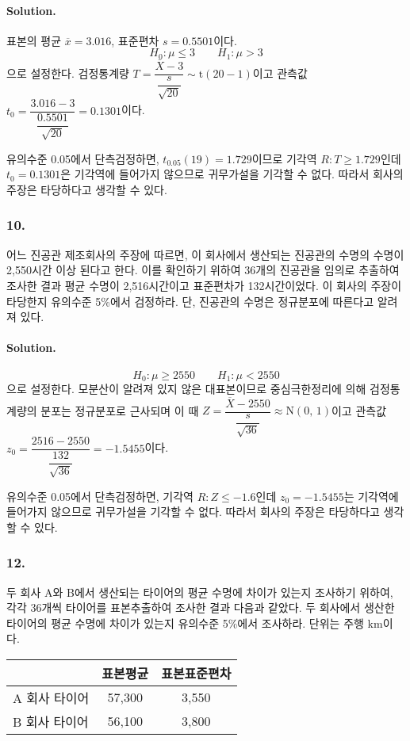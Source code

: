 \paragraph{Solution.} 표본의 평균 $\overline{x}=3.016$, 표준편차 $s=0.5501$이다.
\[H_0:\mu\leq3 \qquad H_1:\mu>3\]
으로 설정한다. 검정통계량 $T=\dfrac{\overline{X}-3}{\dfrac{s}{\sqrt{20}}}\sim \mathrm{t}\left(20-1\right)$이고
관측값 $t_0=\dfrac{3.016-3}{\dfrac{0.5501}{\sqrt{20}}}=0.1301$이다.

유의수준 0.05에서 단측검정하면, $t_{0.05}\left(19\right)=1.729$이므로 기각역 $R:T\geq 1.729$인데
$t_0=0.1301$은 기각역에 들어가지 않으므로 귀무가설을 기각할 수 없다. 따라서 회사의 주장은 타당하다고 생각할 수 있다.

\subsubsection{10.} 어느 진공관 제조회사의 주장에 따르면, 이 회사에서 생산되는 진공관의 수명의 수명이 2,550시간 이상 된다고 한다.
이를 확인하기 위하여 36개의 진공관을 임의로 추출하여 조사한 결과 평균 수명이 2,516시간이고 표준편차가 132시간이었다. 이 회사의 주장이 타당한지
유의수준 5\%에서 검정하라. 단, 진공관의 수명은 정규분포에 따른다고 알려져 있다.

\paragraph{Solution.}
\[H_0:\mu\geq2550 \qquad H_1:\mu<2550\]
으로 설정한다. 모분산이 알려져 있지 않은 대표본이므로 중심극한정리에 의해 검정통계량의 분포는 정규분포로 근사되며
이 때 $Z=\dfrac{\overline{X}-2550}{\dfrac{s}{\sqrt{36}}}\approx \mathrm{N}\left(0,\,1\right)$이고
관측값 $z_0=\dfrac{2516-2550}{\dfrac{132}{\sqrt{36}}}=-1.5455$이다.

유의수준 0.05에서 단측검정하면, 기각역 $R:Z\leq -1.6$인데
$z_0=-1.5455$는 기각역에 들어가지 않으므로 귀무가설을 기각할 수 없다. 따라서 회사의 주장은 타당하다고 생각할 수 있다.

\subsubsection{12.} 두 회사 A와 B에서 생산되는 타이어의 평균 수명에 차이가 있는지 조사하기 위하여, 각각 36개씩 타이어를 표본추출하여 조사한 결과
다음과 같았다. 두 회사에서 생산한 타이어의 평균 수명에 차이가 있는지 유의수준 5\%에서 조사하라. 단위는 주행 km이다.

\begin{center}
    \begin{tabular}{l|cc}
        \hline
         & 표본평균 & 표본표준편차 \\
        \hline
        A 회사 타이어 & 57,300 & 3,550 \\ 
        B 회사 타이어 & 56,100 & 3,800 \\
        \hline
    \end{tabular}
\end{center}

